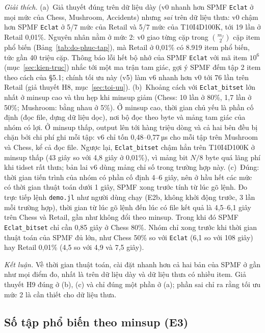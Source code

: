 \emph{Giải thích.} (a)~Giả thuyết đúng trên dữ liệu dày (v0 nhanh hơn SPMF \texttt{Eclat} ở mọi mức của Chess, Mushroom, Accidents) nhưng \emph{sai} trên dữ liệu thưa: v0 chậm hơn SPMF \texttt{Eclat} ở 5/7 mức của Retail và 5/7 mức của T10I4D100K, tới 19 lần ở Retail 0,01\%. Nguyên nhân nằm ở mức 2: v0 giao từng cặp trong $\binom{m_f}{2}$ cặp item phổ biến (Bảng~\ref{tab:do-phuc-tap}), mà Retail ở 0,01\% có 8.919 item phổ biến, tức gần 40 triệu cặp. Thông báo lỗi hết bộ nhớ của SPMF \texttt{Eclat} với mã item $10^6$ (mục~\ref{sec:kien-truc}) nhắc tới một ma trận tam giác, gợi ý SPMF đếm tập 2 item theo cách của §5.1; chính tối ưu này (v5) làm v6 nhanh hơn v0 tới 76 lần trên Retail (giả thuyết H8, mục~\ref{sec:toi-uu}). (b)~Khoảng cách với \texttt{Eclat\_bitset} lớn nhất ở minsup cao và thu hẹp khi minsup giảm (Chess: 10 lần ở 80\%, 1,7 lần ở 50\%; Mushroom: bằng nhau ở 5\%). Ở minsup cao, thời gian chủ yếu là phần cố định (đọc file, dựng dữ liệu dọc), nơi bộ đọc theo byte và mảng tam giác của nhóm có lợi. Ở minsup thấp, output lên tới hàng triệu dòng và cả hai bên đều bị chặn bởi chi phí ghi mỗi tập: v6 chỉ tốn 0,48--0,77\,µs cho mỗi tập trên Mushroom và Chess, kể cả đọc file. Ngược lại, \texttt{Eclat\_bitset} chậm hẳn trên T10I4D100K ở minsup thấp (43 giây so với 4,8 giây ở 0,01\%), vì mảng bit $N/8$ byte quá lãng phí khi tidset rất thưa; bản lai v6 dùng mảng chỉ số trong trường hợp này. (c)~Đúng: thời gian tiến trình của nhóm có phần cố định 4--6 giây, nên ở hầu hết các mức có thời gian thuật toán dưới 1 giây, SPMF xong trước tính từ lúc gõ lệnh. Đo trực tiếp lệnh \texttt{demo.jl} như người dùng chạy (E2b, không khởi động trước, 3 lần mỗi trường hợp), thời gian từ lúc gõ lệnh đến lúc có file kết quả là 4,5--6,1 giây trên Chess và Retail, gần như không đổi theo minsup. Trong khi đó SPMF \texttt{Eclat\_bitset} chỉ cần 0,85 giây ở Chess 80\%. Nhóm chỉ xong trước khi thời gian thuật toán của SPMF đủ lớn, như Chess 50\% so với \texttt{Eclat} (6,1 so với 108 giây) hay Retail 0,01\% (4,5 so với 4,9 và 7,5 giây).

\emph{Kết luận.} Về thời gian thuật toán, cài đặt nhanh hơn cả hai bản của SPMF ở gần như mọi điểm đo, nhất là trên dữ liệu dày và dữ liệu thưa có nhiều item. Giả thuyết H9 đúng ở (b), (c) và chỉ đúng một phần ở (a); phần sai chỉ ra rằng tối ưu mức 2 là cần thiết cho dữ liệu thưa.

\subsection{Số tập phổ biến theo minsup (E3)}
\label{sec:e3}

